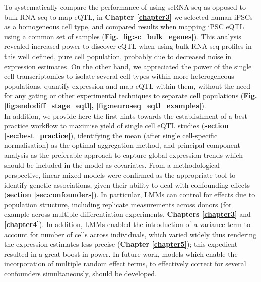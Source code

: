 To systematically compare the performance of using scRNA-seq as opposed to bulk RNA-seq to map eQTL, in \textbf{Chapter \ref{chapter3}} we selected human iPSCs as a homogeneous cell type, and compared results when mapping iPSC eQTL using a common set of samples (\textbf{Fig. \ref{fig:sc_bulk_egenes}}). This analysis revealed increased power to discover eQTL when using bulk RNA-seq profiles in this well defined, pure cell population, probably due to decreased noise in expression estimates.
On the other hand, we appreciated the power of the single cell transcriptomics to isolate several cell types within more heterogeneous populations, quantify expression and map eQTL within them, without the need for any gating or other experimental techniques to separate cell populations (\textbf{Fig. \ref{fig:endodiff_stage_eqtl}, \ref{fig:neuroseq_eqtl_examples}}). \\

In addition, we provide here the first hints towards the establishment of a best-practice workflow to maximise yield of single cell eQTL studies (\textbf{section \ref{sec:best_practice}}), identifying the mean (after single cell-specific normalisation) as the optimal aggregation method, and principal component analysis as the preferable approach to capture global expression trends which should be included in the model as covariates. 
From a methodological perspective, linear mixed models were confirmed as the appropriate tool to identify genetic associations, given their ability to deal with confounding effects (\textbf{section \ref{sec:confounders}}).
In particular, LMMs can control for effects due to population structure, including replicate measurements across donors (for example across multiple differentiation experiments, \textbf{Chapters \ref{chapter3}} and \textbf{\ref{chapter4}}).
In addition, LMMs enabled the introduction of a variance term to account for number of cells across individuals, which varied widely thus rendering the expression estimates less precise (\textbf{Chapter \ref{chapter5}}); this expedient resulted in a great boost in power. 
In future work, models which enable the incorporation of multiple random effect terms, to effectively correct for several confounders simultaneously, should be developed. 
\\

